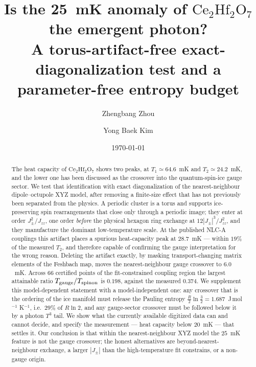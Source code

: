\documentclass[aps,prb,preprint,amsmath,amssymb,superscriptaddress,
longbibliography,floatfix]{revtex4-2}
\newcommand{\Jzz}{J_{zz}}
\newcommand{\Jpm}{J_{\pm}}
\newcommand{\CHO}{\mathrm{Ce_2Hf_2O_7}}
\begin{document}
\title{Is the 25~mK anomaly of $\mathrm{Ce_2Hf_2O_7}$ the emergent photon?\\
A torus-artifact-free exact-diagonalization test and a parameter-free
entropy budget}

\author{Zhengbang Zhou}

\author{Yong Baek Kim}

\date{\today}

\begin{abstract}
The heat capacity of $\CHO$ shows two peaks, at $T_1\simeq64.6$~mK and
$T_2\simeq24.2$~mK, and the lower one has been discussed as the crossover into
the quantum-spin-ice gauge sector.  We test that identification with exact
diagonalization of the nearest-neighbour dipole--octupole XYZ model, after
removing a finite-size effect that has not previously been separated from the
physics.  A periodic cluster is a torus and supports ice-preserving spin
rearrangements that close only through a periodic image; they enter at order
$\Jpm^2/\Jzz$, one order \emph{before} the physical hexagon ring exchange at
$12|\Jpm|^3/\Jzz^2$, and they manufacture the dominant low-temperature scale.
At the published NLC-A couplings this artifact places a spurious heat-capacity
peak at $28.7$~mK --- within $19\%$ of the measured $T_2$, and therefore
capable of confirming the gauge interpretation for the wrong reason.  Deleting
the artifact exactly, by masking transport-changing matrix elements of the
Feshbach map, moves the nearest-neighbour gauge crossover to $6.0$~mK.  Across
$66$ certified points of the fit-constrained coupling region the largest
attainable ratio $T_{\rm gauge}/T_{\rm spinon}$ is $0.198$, against the
measured $0.374$.  We supplement this model-dependent statement with a
model-independent one: any crossover that is the ordering of the ice manifold
must release the Pauling entropy $\tfrac{R}{2}\ln\tfrac32=1.687$~J\,mol$^{-1}$
K$^{-1}$, i.e.\ $29\%$ of $R\ln2$, and any gauge-sector crossover must be
followed below it by a photon $T^3$ tail.  We show what the currently available
digitized data can and cannot decide, and specify the measurement --- heat
capacity below $20$~mK --- that settles it.  Our conclusion is that within the
nearest-neighbour XYZ model the $25$~mK feature is not the gauge crossover; the
honest alternatives are beyond-nearest-neighbour exchange, a larger $|\Jpm|$
than the high-temperature fit constrains, or a non-gauge origin.
\end{abstract}
\end{document}
